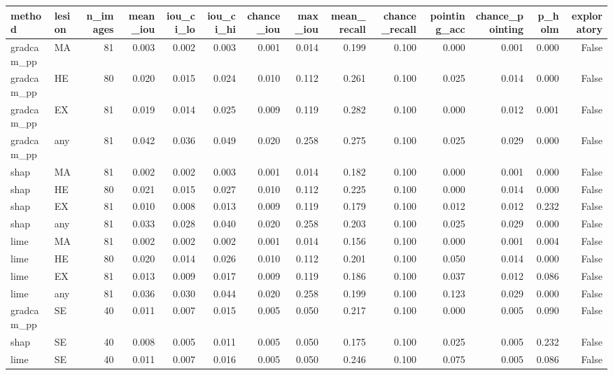 \begin{tabular}{llrrrrrrrrrrrr}
\toprule
method & lesion & n_images & mean_iou & iou_ci_lo & iou_ci_hi & chance_iou & max_iou & mean_recall & chance_recall & pointing_acc & chance_pointing & p_holm & exploratory \\
\midrule
gradcam_pp & MA & 81 & 0.003 & 0.002 & 0.003 & 0.001 & 0.014 & 0.199 & 0.100 & 0.000 & 0.001 & 0.000 & False \\
gradcam_pp & HE & 80 & 0.020 & 0.015 & 0.024 & 0.010 & 0.112 & 0.261 & 0.100 & 0.025 & 0.014 & 0.000 & False \\
gradcam_pp & EX & 81 & 0.019 & 0.014 & 0.025 & 0.009 & 0.119 & 0.282 & 0.100 & 0.000 & 0.012 & 0.001 & False \\
gradcam_pp & any & 81 & 0.042 & 0.036 & 0.049 & 0.020 & 0.258 & 0.275 & 0.100 & 0.025 & 0.029 & 0.000 & False \\
shap & MA & 81 & 0.002 & 0.002 & 0.003 & 0.001 & 0.014 & 0.182 & 0.100 & 0.000 & 0.001 & 0.000 & False \\
shap & HE & 80 & 0.021 & 0.015 & 0.027 & 0.010 & 0.112 & 0.225 & 0.100 & 0.000 & 0.014 & 0.000 & False \\
shap & EX & 81 & 0.010 & 0.008 & 0.013 & 0.009 & 0.119 & 0.179 & 0.100 & 0.012 & 0.012 & 0.232 & False \\
shap & any & 81 & 0.033 & 0.028 & 0.040 & 0.020 & 0.258 & 0.203 & 0.100 & 0.025 & 0.029 & 0.000 & False \\
lime & MA & 81 & 0.002 & 0.002 & 0.002 & 0.001 & 0.014 & 0.156 & 0.100 & 0.000 & 0.001 & 0.004 & False \\
lime & HE & 80 & 0.020 & 0.014 & 0.026 & 0.010 & 0.112 & 0.201 & 0.100 & 0.050 & 0.014 & 0.000 & False \\
lime & EX & 81 & 0.013 & 0.009 & 0.017 & 0.009 & 0.119 & 0.186 & 0.100 & 0.037 & 0.012 & 0.086 & False \\
lime & any & 81 & 0.036 & 0.030 & 0.044 & 0.020 & 0.258 & 0.199 & 0.100 & 0.123 & 0.029 & 0.000 & False \\
gradcam_pp & SE & 40 & 0.011 & 0.007 & 0.015 & 0.005 & 0.050 & 0.217 & 0.100 & 0.000 & 0.005 & 0.090 & False \\
shap & SE & 40 & 0.008 & 0.005 & 0.011 & 0.005 & 0.050 & 0.175 & 0.100 & 0.025 & 0.005 & 0.232 & False \\
lime & SE & 40 & 0.011 & 0.007 & 0.016 & 0.005 & 0.050 & 0.246 & 0.100 & 0.075 & 0.005 & 0.086 & False \\
\bottomrule
\end{tabular}
